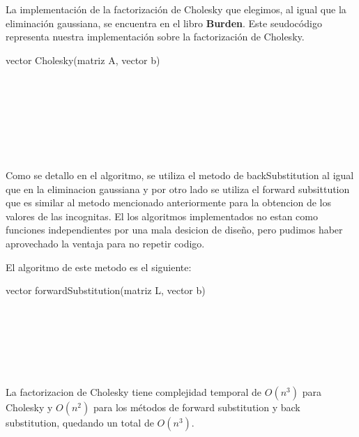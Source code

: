La implementación de la factorización de Cholesky que elegimos, al igual que la eliminación gaussiana, se encuentra en el libro \textbf{Burden}.
Este seudocódigo representa nuestra implementación sobre la factorización de Cholesky.

\begin{algorithm}
    \begin{algorithmic}[1]\parskip=2mm
        \caption{vector Cholesky(matriz A, vector b)}
        \\
        \\
        \\
        \\
        \\
        \\
    \end{algorithmic}
\end{algorithm}

Como se detallo en el algoritmo, se utiliza el metodo de backSubstitution al igual que en la eliminacion gaussiana y por otro lado se utiliza el forward subsittution que es similar al metodo mencionado anteriormente para la obtencion de los valores de las incognitas. El los algoritmos implementados no estan como funciones independientes por una mala desicion de dise\~no, pero pudimos haber aprovechado la ventaja para no repetir codigo.

El algoritmo de este metodo es el siguiente:
\begin{algorithm}
    \begin{algorithmic}[1]\parskip=2mm
        \caption{vector forwardSubstitution(matriz L, vector b)}
        \\ 
        \\
        \\
        \\
        \\
      \end{algorithmic}
\end{algorithm}

La factorizacion de Cholesky tiene complejidad temporal de $O(n^3)$ para Cholesky y $O(n^2)$ para los métodos de forward substitution y back substitution, quedando un total de $O(n^3)$.

\newpage
